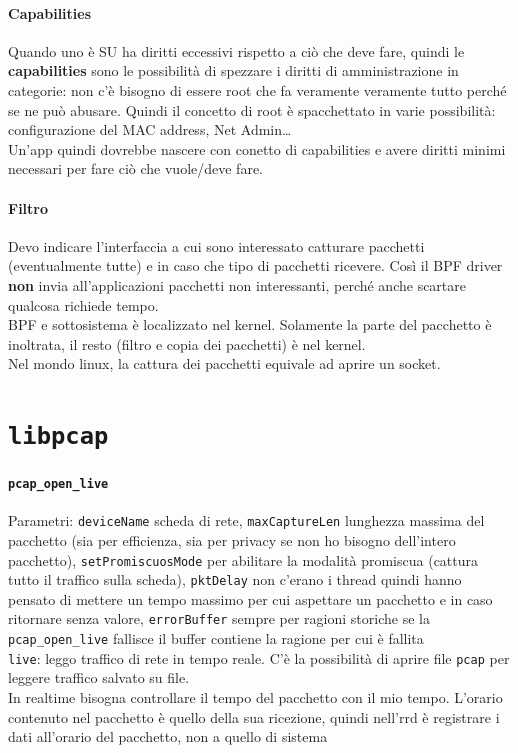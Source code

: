 \documentclass[10pt]{book}
\begin{document}
\paragraph{Capabilities} Quando uno è SU ha diritti eccessivi rispetto a ciò che deve fare, quindi le \textbf{capabilities} sono le possibilità di spezzare i diritti di amministrazione in categorie: non c'è bisogno di essere root che fa veramente veramente tutto perché se ne può abusare. Quindi il concetto di root è spacchettato in varie possibilità: configurazione del MAC address, Net Admin\ldots\\
Un'app quindi dovrebbe nascere con conetto di capabilities e avere diritti minimi necessari per fare ciò che vuole/deve fare.
\paragraph{Filtro} Devo indicare l'interfaccia a cui sono interessato catturare pacchetti (eventualmente tutte) e in caso che tipo di pacchetti ricevere. Così il BPF driver \textbf{non} invia all'applicazioni pacchetti non interessanti, perché anche scartare qualcosa richiede tempo.\\
BPF e sottosistema è localizzato nel kernel. Solamente la parte del pacchetto è inoltrata, il resto (filtro e copia dei pacchetti) è nel kernel.\\
Nel mondo linux, la cattura dei pacchetti equivale ad aprire un socket.
\section{\texttt{libpcap}}
\paragraph{\texttt{pcap\_open\_live}} Parametri: \texttt{deviceName} scheda di rete, \texttt{maxCaptureLen} lunghezza massima del pacchetto (sia per efficienza, sia per privacy se non ho bisogno dell'intero pacchetto), \texttt{setPromiscuosMode} per abilitare la modalità promiscua (cattura tutto il traffico sulla scheda), \texttt{pktDelay} non c'erano i thread quindi hanno pensato di mettere un tempo massimo per cui aspettare un pacchetto e in caso ritornare senza valore, \texttt{errorBuffer} sempre per ragioni storiche se la \texttt{pcap\_open\_live} fallisce il buffer contiene la ragione per cui è fallita\\
\texttt{live}: leggo traffico di rete in tempo reale. C'è la possibilità di aprire file \texttt{pcap} per leggere traffico salvato su file.\\
In realtime bisogna controllare il tempo del pacchetto con il mio tempo. L'orario contenuto nel pacchetto è quello della sua ricezione, quindi nell'rrd è registrare i dati all'orario del pacchetto, non a quello di sistema
\end{document}
